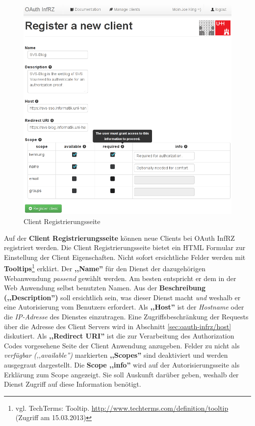 \documentclass[12pt,a4paper,pointednumbers,abstracton]{scrartcl}
\begin{document}
\begin{figure}[h!]
\centering
\includegraphics[width=15cm]{img/oauth_infrz/client_new}
\caption{Client Registrierungsseite}
\label{pic:oauth_infrz/client_new}
\end{figure}

Auf der \textbf{Client Registrierungsseite} können neue Clients bei OAuth InfRZ registriert werden.
Die Client Registrierungsseite bietet ein HTML Formular zur Einstellung der Client Eigenschaften.
Nicht sofort ersichtliche Felder werden mit \textbf{Tooltips}\footnote{vgl. TechTerms: Tooltip. \url{http://www.techterms.com/definition/tooltip} (Zugriff am 15.03.2013)} erklärt.
Der \textbf{,,Name''} für den Dienst der dazugehörigen Webanwendung \emph{passend} gewählt werden.
Am besten entspricht er dem in der Web Anwendung selbst benutzten Namen.
Aus der \textbf{Beschreibung (,,Description'')} soll ersichtlich sein, was dieser Dienst macht \emph{und} weshalb er eine Autorisierung vom Benutzers erfordert.
Als \textbf{,,Host''} ist der \emph{Hostname} oder die \emph{IP-Adresse} des Dienstes einzutragen.
Eine Zugriffsbeschränkung der Requests über die Adresse des Client Servers wird in Abschnitt \ref{sec:oauth-infrz/host} diskutiert.
Als \textbf{,,Redirect URI''} ist die zur Verarbeitung des Authorization Codes vorgesehene Seite der Client Anwendung anzugeben.
Felder zu nicht als \emph{verfügbar (,,available'')} markierten \textbf{,,Scopes''} sind deaktiviert und werden ausgegraut dargestellt.
Die \textbf{Scope ,,info''} wird auf der Autorisierungsseite als Erklärung zum Scope angezeigt.
Sie soll Auskunft darüber geben, weshalb der Dienst Zugriff auf diese Information benötigt.
\end{document}
